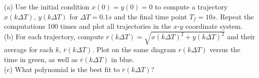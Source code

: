\documentclass{article}
\begin{document}
\noindent (a) Use the initial condition $x(0)=y(0)=0$ to compute a trajectory $x(k\Delta T)$, $y(k \Delta T)$ for $\Delta T=0.1s$ and the final time point $T_f=10s$. Repeat the computations 
100 times and plot all trajectories in the $x$-$y$ coordinate system. \\

\noindent (b) For each trajectory, compute $r(k\Delta T)=\sqrt{x(k\Delta T)^2+y(k\Delta T)^2}$ 
and their average for each $k$, $\overline{r}(k\Delta T)$. Plot on the same diagram  
 $r(k\Delta T)$ versus the time in green, as well as  $\overline{r}(k\Delta T)$ in blue. \\

\noindent (c) What polynomial is the best fit to $\overline{r}(k\Delta T)$?
\end{document}
